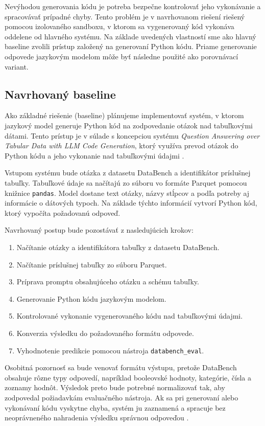 Nevýhodou generovania kódu je potreba bezpečne kontrolovať jeho vykonávanie a spracovávať prípadné chyby. Tento problém je v navrhovanom riešení riešený pomocou izolovaného sandboxu, v ktorom sa vygenerovaný kód vykonáva oddelene od hlavného systému. Na základe uvedených vlastností sme ako hlavný baseline zvolili prístup založený na generovaní Python kódu. Priame generovanie odpovede jazykovým modelom môže byť následne použité ako porovnávací variant.

\subsection{Navrhovaný baseline}
\label{subsec:baseline}

Ako základné riešenie (baseline) plánujeme implementovať systém, v ktorom jazykový model generuje Python kód na zodpovedanie otázok nad tabuľkovými dátami. Tento prístup je v súlade s koncepciou systému \textit{Question Answering over Tabular Data with LLM Code  Generation}, ktorý využíva prevod otázok do Python kódu a jeho vykonanie nad tabuľkovými údajmi \cite{tabularqa}.

Vstupom systému bude otázka z datasetu DataBench a identifikátor príslušnej tabuľky. Tabuľkové údaje sa načítajú zo súboru vo formáte Parquet pomocou knižnice \texttt{pandas}. Model dostane text otázky, názvy stĺpcov a podľa potreby aj informácie o dátových typoch. Na základe týchto informácií vytvorí Python kód, ktorý vypočíta požadovanú odpoveď.

Navrhovaný postup bude pozostávať z nasledujúcich krokov:

\begin{enumerate}
    \item Načítanie otázky a identifikátora tabuľky z datasetu
    DataBench.
    \item Načítanie príslušnej tabuľky zo súboru Parquet.
    \item Príprava promptu obsahujúceho otázku a schému tabuľky.
    \item Generovanie Python kódu jazykovým modelom.
    \item Kontrolované vykonanie vygenerovaného kódu nad
    tabuľkovými údajmi.
    \item Konverzia výsledku do požadovaného formátu odpovede.
    \item Vyhodnotenie predikcie pomocou nástroja
    \texttt{databench\_eval}.
\end{enumerate}

Osobitná pozornosť sa bude venovať formátu výstupu, pretože DataBench obsahuje rôzne typy odpovedí, napríklad booleovské hodnoty, kategórie, čísla a zoznamy hodnôt. Výsledok preto bude potrebné normalizovať tak, aby zodpovedal požiadavkám evaluačného nástroja. Ak sa pri generovaní alebo vykonávaní kódu vyskytne chyba, systém ju zaznamená a spracuje bez neoprávneného nahradenia výsledku správnou odpoveďou \cite{oseibrefo}.

